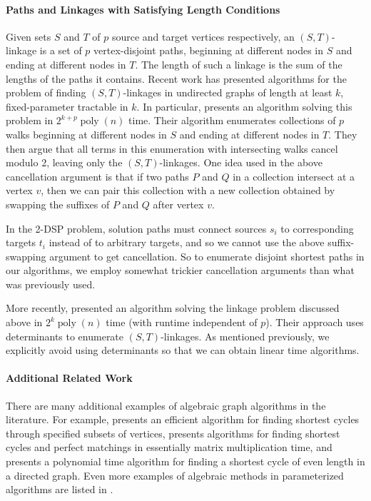 \documentclass[11pt]{article}
\DeclareMathOperator{\poly}{poly}
\theoremstyle{definition}
\begin{document}
\paragraph{Paths and Linkages with Satisfying Length Conditions}
Given sets $S$ and $T$ of $p$ source and target vertices respectively, an $(S,T)$-linkage is a set of $p$ vertex-disjoint paths, beginning at different nodes in $S$ and ending at different nodes in $T$.
The length of such a linkage is the sum of the lengths of the paths it contains.
Recent work has presented algorithms for the problem of finding $(S,T)$-linkages in undirected graphs of length at least $k$, fixed-parameter tractable in $k$.
In particular, \cite[Section 4]{FPT-Max-Colored-Path} presents an algorithm solving this problem in $2^{k+p}\poly(n)$ time.
Their algorithm enumerates collections of $p$ walks beginning at different nodes in $S$ and ending at different nodes in $T$.
They then argue that all terms in this enumeration with intersecting walks cancel modulo 2, leaving only the  $(S,T)$-linkages.
One idea used in the above cancellation argument is that if two paths $P$ and $Q$ in a collection intersect at a vertex $v$, then we can pair this collection with a new collection obtained by swapping the suffixes of $P$ and $Q$ after vertex $v$.

In the \textsf{2-DSP} problem, solution paths must connect sources $s_i$ to corresponding targets $t_i$ instead of to arbitrary targets, and so we cannot use the above suffix-swapping argument to get cancellation.
So to enumerate disjoint shortest paths in our algorithms, we employ somewhat trickier cancellation arguments than what was previously used.

More recently, \cite[Section 6]{Det-Sieving} presented an algorithm solving the linkage problem discussed above in $2^k\poly(n)$ time (with runtime independent of $p$).
Their approach uses determinants to enumerate $(S,T)$-linkages.
As mentioned previously, we explicitly avoid using determinants so that we can obtain linear time algorithms.

\paragraph{Additional Related Work}
There are many additional examples of algebraic graph algorithms in the literature.
For example, \cite{BjorklundHusfeldtTaslaman} presents an efficient algorithm for finding shortest cycles through specified subsets of vertices, \cite{CyganGabowSankowski2015} presents algorithms for finding shortest cycles and perfect matchings in essentially matrix multiplication time, and \cite{BjorklundHusfeldtKaski2022} presents a polynomial time algorithm for finding a shortest cycle of even length in a directed graph.
Even more examples of algebraic methods in  parameterized algorithms are listed in \cite[Table 1]{Det-Sieving}.
\end{document}
